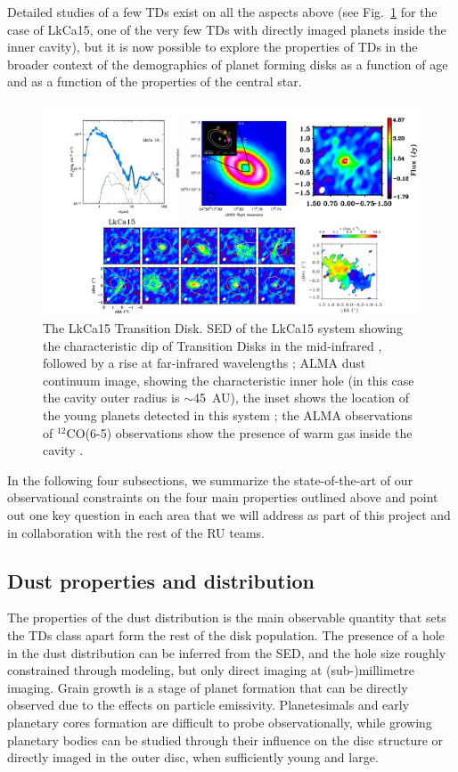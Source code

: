 \documentclass[10pt,fleqn,twoside]{article}
\begin{document}
Detailed studies of a few TDs exist on all the aspects above (see Fig.~\ref{f_examples} for the case of LkCa15, one of the very few TDs with directly imaged planets inside the inner cavity), but it is now possible to explore the properties of TDs in the broader context of the demographics of planet forming disks as a function of age and as a function of the properties of the central star.  
\begin{figure}
\centerline{\includegraphics[scale=0.5]{Figure_LkCa15.pdf}}
\caption{The LkCa15 Transition Disk.  SED of the LkCa15 system showing the characteristic dip
  of Transition Disks in the mid-infrared , followed by a rise at
  far-infrared wavelengths \citep{2011ApJ...728...49E}; ALMA dust continuum
  image, showing the characteristic inner hole (in this case the cavity
  outer radius is $\sim$45~AU), the inset shows the location of the young
  planets detected in this system \citep{2015Natur.527..342S}; the ALMA
  observations of $^{12}$CO(6-5) observations show the presence of warm gas
  inside the cavity \citep{2015A&A...579A.106V}.}
\label{f_examples}
\end{figure}

In the following four subsections, we summarize the state-of-the-art of our observational constraints on the four main properties outlined above and point out one key question in each area that we will address as part of this project and in collaboration with the rest of the RU teams.

\subsection{Dust properties and distribution} 
The properties of the dust distribution is the main observable quantity that sets the TDs class apart form the rest of the disk population. The presence of a hole in the dust distribution can be inferred from the SED, and the hole size roughly constrained through modeling, but only direct imaging at (sub-)millimetre imaging.
Grain growth is a stage of planet formation that can be directly observed due to the effects on particle emissivity. Planetesimals and early planetary cores formation are difficult to probe observationally, while growing planetary bodies can be studied through their influence on the disc structure or directly imaged in the outer disc, when sufficiently young and large.
\end{document}

